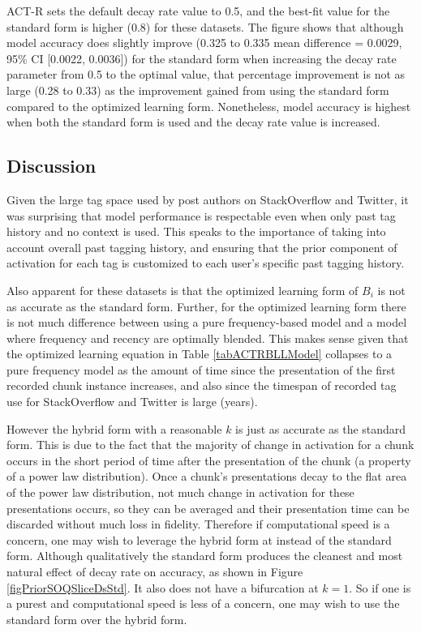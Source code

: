 \documentclass[man,floatsintext,donotrepeattitle]{apa6}
\newcommand{\myCI}[4]{{mean difference = \num{#1}, 95\% CI [\num{#2}, \num{#3}]}}
\begin{document}
ACT-R sets the default decay rate value to \num{0.5}, and the best-fit value for the standard form is higher (\num{0.8}) for these datasets.
The figure shows that although model accuracy does slightly improve (\num{0.325} to \num{0.335} \myCI{.0029}{.0022}{.0036}{3609}) for the standard form when increasing the decay rate parameter from \num{0.5} to the optimal value,
that percentage improvement is not as large (\num{0.28} to \num{0.33}) as the improvement gained from using the standard form compared to the optimized learning form.
Nonetheless, model accuracy is highest when both the standard form is used and the decay rate value is increased. 

\subsection{Discussion}

Given the large tag space used by post authors on StackOverflow and Twitter, it was surprising that model performance is respectable even when only past tag history and no context is used.
This speaks to the importance of taking into account overall past tagging history, and ensuring that the prior component of activation for each tag is customized to each user's specific past tagging history.

Also apparent for these datasets is that the optimized learning form of $B_{i}$ is not as accurate as the standard form.
Further, for the optimized learning form there is not much difference between using a pure frequency-based model and a model where frequency and recency are optimally blended.
This makes sense given that the optimized learning equation in Table \ref{tabACTRBLLModel} collapses to a pure frequency model as the amount of time since the presentation of the first recorded chunk instance increases,
and also since the timespan of recorded tag use for StackOverflow and Twitter is large (years).

However the hybrid form with a reasonable $k$ is just as accurate as the standard form.
This is due to the fact that the majority of change in activation for a chunk occurs in the short period of time after the presentation of the chunk (a property of a power law distribution).
Once a chunk's presentations decay to the flat area of the power law distribution, not much change in activation for these presentations occurs, so they can be averaged and their presentation time can be discarded without much loss in fidelity.
Therefore if computational speed is a concern, one may wish to leverage the hybrid form at instead of the standard form.
Although qualitatively the standard form produces the cleanest and most natural effect of decay rate on accuracy, as shown in Figure \ref{figPriorSOQSliceDsStd}.
It also does not have a bifurcation at $k=1$.
So if one is a purest and computational speed is less of a concern, one may wish to use the standard form over the hybrid form.
\end{document}
